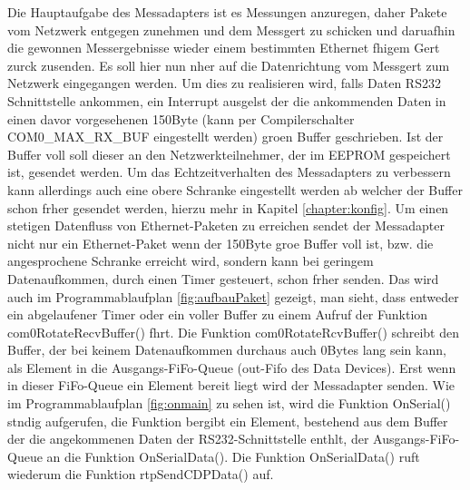\documentclass[a4paper]{book}%
\begin{document}
Die Hauptaufgabe des Messadapters ist es Messungen anzuregen, daher Pakete vom Netzwerk entgegen zunehmen und dem Messgert zu schicken und daruafhin die gewonnen Messergebnisse wieder einem bestimmten Ethernet fhigem Gert zurck zusenden. Es soll hier nun nher auf die Datenrichtung vom Messgert zum Netzwerk eingegangen werden.
Um dies zu realisieren wird, falls Daten RS232 Schnittstelle ankommen, ein Interrupt ausgelst der die ankommenden Daten in einen davor vorgesehenen 150Byte  (kann per Compilerschalter COM0\_MAX\_RX\_BUF eingestellt werden)  groen Buffer geschrieben. Ist der Buffer voll soll dieser an den Netzwerkteilnehmer, der im EEPROM gespeichert ist, gesendet werden. Um das Echtzeitverhalten des Messadapters zu verbessern kann allerdings auch eine obere Schranke eingestellt werden ab welcher der Buffer schon frher gesendet werden, hierzu mehr in Kapitel \ref{chapter:konfig}.
Um einen stetigen Datenfluss von Ethernet-Paketen zu erreichen  sendet der Messadapter nicht nur ein Ethernet-Paket wenn der 150Byte groe Buffer voll ist, bzw. die angesprochene Schranke erreicht wird, sondern kann bei geringem Datenaufkommen, durch einen Timer gesteuert, schon frher  senden. Das wird auch im Programmablaufplan \ref{fig:aufbauPaket} gezeigt, man sieht, dass entweder ein abgelaufener Timer oder ein voller Buffer zu einem Aufruf der Funktion com0RotateRecvBuffer() fhrt.
Die Funktion com0RotateRcvBuffer() schreibt den Buffer, der bei keinem Datenaufkommen durchaus auch 0Bytes lang sein kann, als Element in die Ausgangs-FiFo-Queue (out-Fifo des Data Devices). Erst wenn in dieser FiFo-Queue ein Element bereit liegt wird der Messadapter senden.
Wie im Programmablaufplan \ref{fig:onmain} zu sehen ist, wird die Funktion OnSerial() stndig aufgerufen, die Funktion bergibt ein Element, bestehend aus dem Buffer der die angekommenen Daten der RS232-Schnittstelle enthlt, der Ausgangs-FiFo-Queue an die Funktion OnSerialData(). Die Funktion OnSerialData() ruft wiederum die Funktion rtpSendCDPData() auf.
\end{document}
